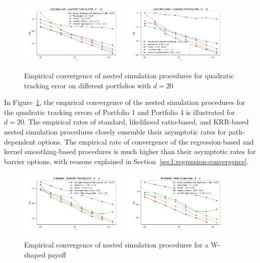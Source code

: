 \begin{figure}[ht!] 
    \centering
    \includegraphics[width=0.48\textwidth]{./project1/figures/figure6a.png}
    \includegraphics[width=0.48\textwidth]{./project1/figures/figure6b.png}
    \caption{Empirical convergence of nested simulation procedures for quadratic tracking error on different portfolios with $d=20$}
    \label{fig1:1x03} 
\end{figure}

In Figure~\ref{fig1:1x03}, the empirical convergence of the nested simulation procedures for the quadratic tracking errors of Portfolio 1 and Portfolio 4 is illustrated for $d = 20$.
The empirical rates of standard, likelihood ratio-based, and KRR-based nested simulation procedures closely ensemble their asymptotic rates for path-dependent options.
The empirical rate of convergence of the regression-based and kernel smoothing-based procedures is much higher than their asymptotic rates for barrier options, with reasons explained in Section~\ref{sec1:regression-convergence}.

\begin{figure}[ht!] 
    \centering
    \includegraphics[width=0.48\textwidth]{./project1/figures/figure7a.png}
    \includegraphics[width=0.48\textwidth]{./project1/figures/figure7b.png}
    \caption{Empirical convergence of nested simulation procedures for a W-shaped payoff}
    \label{fig1:5503} 
\end{figure}

